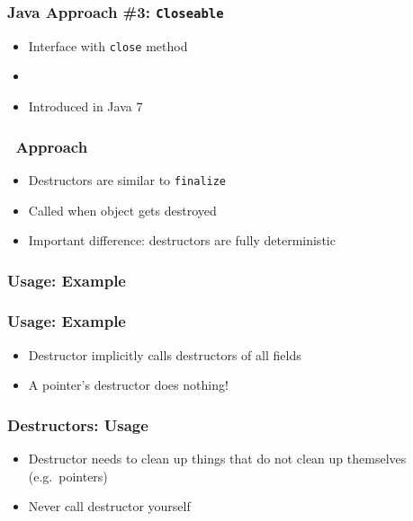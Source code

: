 \begin{frame}
  \frametitle{Java Approach \#3: {\tt Closeable}}
  \begin{itemize}
    \item Interface with {\tt close} method
    \item {}
    \item Introduced in Java 7
  \end{itemize}
  \vskip5mm
\end{frame}

\begin{frame}
  \frametitle{\cpp\ Approach}
  \begin{itemize}
    \item Destructors are similar to {\tt finalize}
    \item Called when object gets destroyed
    \item Important difference: destructors are fully deterministic
  \end{itemize}
  \vskip5mm
  \begin{overprint}



  \end{overprint}
\end{frame}

\begin{frame}
  \frametitle{Usage: Example}
\end{frame}

\begin{frame}
  \frametitle{Usage: Example}
  \begin{itemize}
    \item Destructor implicitly calls destructors of all fields
    \item A pointer's destructor does nothing!
  \end{itemize}
\end{frame}



\begin{frame}
  \frametitle{Destructors: Usage}
  \begin{itemize}
    \item Destructor needs to clean up things that do not clean up themselves (e.g.~pointers)
    \item Never call destructor yourself
  \end{itemize}
\end{frame}


